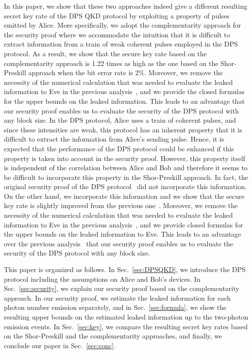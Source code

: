 \documentclass[prl,twocolumn,superscriptaddress,nofootinbib]{revtex4}
\begin{document}
In this paper, we show that these two approaches indeed give a different resulting secret key rate of the
DPS QKD protocol by exploiting a property of pulses emitted by Alice.
More specifically, we adopt the complementarity approach for the security proof where we accommodate the intuition that 
it is difficult to extract information from a train of weak coherent pulses employed in the DPS protocol.
As a result, we show that the secure key rate based on the complementarity approach is 1.22 times
as high as the one based on the Shor-Preskill approach when the bit error rate is 2\%.
Moreover, we remove the necessity of the numerical calculation that was needed to evaluate the leaked information to Eve
in the previous analysis~\cite{Kiyoshi2012dps}, and we provide the closed formulas for the upper bounds on the
leaked information.
This leads to an advantage that our security proof enables us to evaluate the security of the DPS protocol with any block size.
In the DPS protocol, Alice uses a train of coherent pulses, and since these intensities are weak, this protocol has
an inherent property that it is difficult to extract the information from Alice's sending pulse. 
Hence, it is expected that the performance of the DPS protocol could be enhanced if this property is 
taken into account in the security proof. 
However, this property itself is independent of the correlation between Alice and Bob and therefore 
it seems to be difficult to incorporate this property in the Shor-Preskill approach. 
In fact, the original security proof of the DPS protocol~\cite{Kiyoshi2012dps} did not incorporate this information. 
On the other hand, we incorporate this information and we 
show that the secure key rate is slightly improved from the previous one~\cite{Kiyoshi2012dps}. 
Moreover, we remove the necessity of the numerical calculation that was needed to evaluate the leaked information to Eve
in the previous analysis~\cite{Kiyoshi2012dps}, and we provide closed formulas for the upper bounds on the
leaked information to Eve. This leads to an advantage over the previous analysis~\cite{Kiyoshi2012dps}
that our security proof enables us to evaluate the security of the DPS protocol with any block size.
\fi

This paper is organized as follows. 
In Sec.~\ref{sec:DPSQKD}, we introduce the DPS protocol including the assumptions on Alice and Bob's devices. 
In Sec.~\ref{sec:security}, we explain our security proof based on the complementarity approach.
In our security proof, we estimate the leaked information for each photon number emission separately, and
in Sec.~\ref{sec:formula}, we show the resulting upper bounds on the estimated leaked information up to the two-photon emission
events. 
In Sec.~\ref{sec:key}, we compare the resulting secret key rates based on the Shor-Preskill and the complementarity approaches,
and finally, we conclude our paper in Sec.~\ref{sec:conc}. 
\end{document}

